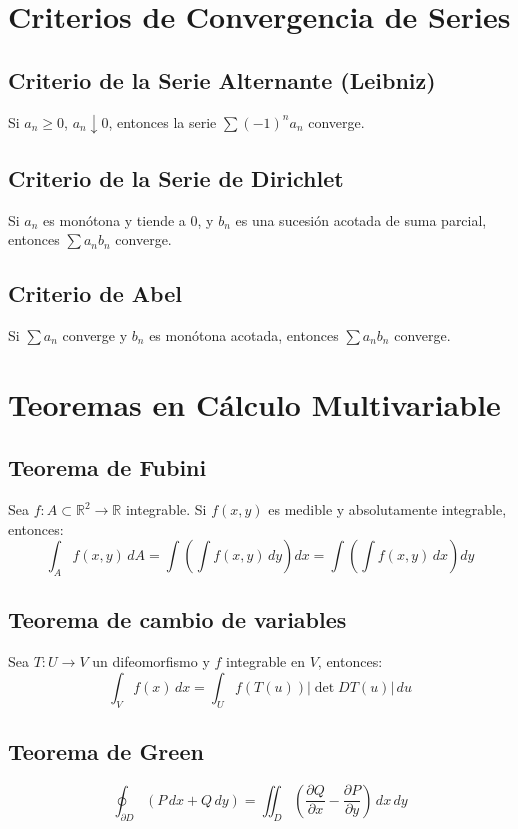 \documentclass[12pt]{article}
\begin{document}
\section{Criterios de Convergencia de Series}

\subsection{Criterio de la Serie Alternante (Leibniz)}
Si \(a_n \geq 0\), \(a_n \downarrow 0\), entonces la serie \(\sum (-1)^n a_n\) converge.

\subsection{Criterio de la Serie de Dirichlet}
Si \(a_n\) es monótona y tiende a 0, y \(b_n\) es una sucesión acotada de suma parcial, entonces \(\sum a_n b_n\) converge.

\subsection{Criterio de Abel}
Si \(\sum a_n\) converge y \(b_n\) es monótona acotada, entonces \(\sum a_n b_n\) converge.

\section{Teoremas en Cálculo Multivariable}

\subsection{Teorema de Fubini}
Sea \(f: A \subset \mathbb{R}^2 \to \mathbb{R}\) integrable. Si \(f(x,y)\) es medible y absolutamente integrable, entonces:
\[
\int_A f(x,y)\,dA = \int \left( \int f(x,y)\,dy \right) dx = \int \left( \int f(x,y)\,dx \right) dy
\]

\subsection{Teorema de cambio de variables}
Sea \(T: U \to V\) un difeomorfismo y \(f\) integrable en \(V\), entonces:
\[
\int_V f(x)\,dx = \int_U f(T(u)) \left|\det DT(u)\right|\,du
\]

\subsection{Teorema de Green}
\[
\oint_{\partial D} (P\,dx + Q\,dy) = \iint_D \left( \frac{\partial Q}{\partial x} - \frac{\partial P}{\partial y} \right)\,dx\,dy
\]
\end{document}
